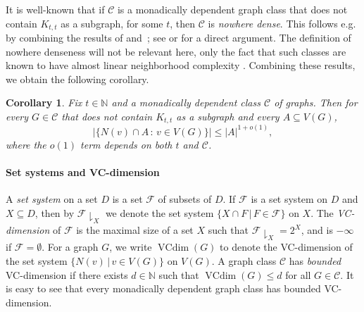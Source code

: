 \documentclass[11pt]{article}
\newtheorem{corollary}[theorem]{Corollary}
\theoremstyle{definition}
\newcommand{\CC}{{\mathscr C}}
\newcommand{\N}{\mathbb{N}}
\renewcommand{\leq}{\leqslant}
\renewcommand{\le}{\leqslant}
\renewcommand{\subset}{\subseteq}
\newcommand{\set}[1]{\{#1\}}
\newcommand{\setof}[2]{\set{#1 \,|\, #2 }}
\newcommand{\res}[1]{{\downharpoonright}_{#1}}
\renewcommand{\cal}{\mathcal}
\DeclareMathOperator{\VCdim}{VCdim}
\begin{document}
It is well-known that if $\CC$ is a monadically dependent graph class
that does not contain $K_{t,t}$ as a subgraph, for some $t$,
then $\CC$ is \emph{nowhere dense}.
This follows e.g. by combining the results of 
\cite{adler2014interpreting} and~\cite{dvovrak2018induced}; see \cite[Lemma~35]{flipping-and-forking} or \cite[Lemma~13.7]{maehlmann-thesis} for a direct argument. 
The definition of nowhere denseness will not be relevant here, only the fact that such classes are known to have almost linear neighborhood complexity \cite{EickmeyerGKKPRS17}.
Combining these results, we obtain  the following corollary.

\begin{corollary}
\label{thm:weaklySparseCase}
Fix $t\in\N$ and a monadically dependent class $\CC$ of graphs. Then for every $G \in \CC$ that does not contain $K_{t,t}$ as a subgraph and every $A \subseteq V(G)$,
\[\Big|\set{N(v)\cap A\,:\,v\in V(G)}\Big| \leq 
|A|^{1+o(1)},\]
where the $o(1)$ term depends on both $t$ and $\CC$.
\end{corollary}




\paragraph{Set systems and VC-dimension}
  A \emph{set system} on a set $D$ is a set $\cal F$ of subsets of $D$.  
  If $\cal F$ is a set system on $D$
  and $X\subset D$,
  then by $\cal F\res X$ we denote the set system $\setof{X\cap F}{F\in\cal F}$ on $X$.
  The \emph{VC-dimension} of $\cal F$ is the maximal size 
  of a set $X$ such that $\cal F\res X=2^X$, and is $-\infty$ if $\cal F=\emptyset$.
For a graph $G$, 
we write $\VCdim(G)$ 
to denote the VC-dimension of the set system $\setof{N(v)}{v\in V(G)}$ on $V(G)$.
A graph class $\CC$ has \emph{bounded} VC-dimension if there exists $d \in \N$ such that $\VCdim(G) \leq d$ for all $G\in \CC$.
It is easy to see that every monadically dependent graph class has bounded VC-dimension.
\end{document}
